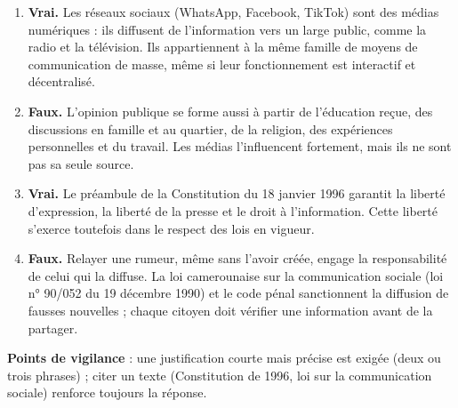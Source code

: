 \documentclass[11pt]{article}
\newcommand{\cle}[1]{{\popxbold\color{popdark}#1}}
\begin{document}
\begin{corrige}
\begin{enumerate}
\item \textbf{Vrai.} Les réseaux sociaux (WhatsApp, Facebook, TikTok) sont des \cle{médias numériques} : ils diffusent de l'information vers un large public, comme la radio et la télévision. Ils appartiennent à la même famille de moyens de communication de masse, même si leur fonctionnement est interactif et décentralisé.
\item \textbf{Faux.} L'\cle{opinion publique} se forme aussi à partir de l'éducation reçue, des discussions en famille et au quartier, de la religion, des expériences personnelles et du travail. Les médias l'influencent fortement, mais ils ne sont pas sa seule source.
\item \textbf{Vrai.} Le préambule de la \cle{Constitution du 18 janvier 1996} garantit la liberté d'expression, la liberté de la presse et le droit à l'information. Cette liberté s'exerce toutefois dans le respect des lois en vigueur.
\item \textbf{Faux.} Relayer une \cle{rumeur}, même sans l'avoir créée, engage la responsabilité de celui qui la diffuse. La loi camerounaise sur la communication sociale (loi n° 90/052 du 19 décembre 1990) et le code pénal sanctionnent la diffusion de fausses nouvelles ; chaque citoyen doit vérifier une information avant de la partager.
\end{enumerate}
\textbf{Points de vigilance} : une justification courte mais précise est exigée (deux ou trois phrases) ; citer un texte (Constitution de 1996, loi sur la communication sociale) renforce toujours la réponse.
\end{corrige}
\end{document}
